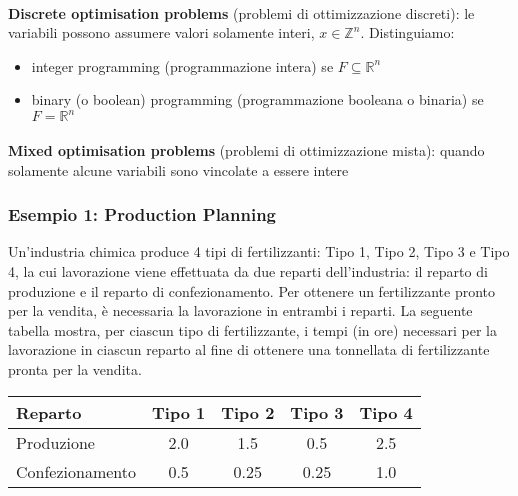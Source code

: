 \documentclass[a4paper, 11pt]{article}
\begin{document}
            \paragraph{}
            \textbf{Discrete optimisation problems} (problemi di ottimizzazione discreti): le variabili possono assumere valori solamente interi, $x \in \mathbb{Z}^n$. Distinguiamo:
            \begin{itemize}
                \item integer programming (programmazione intera) se $F \subseteq \mathbb{R}^n$
                \item binary (o boolean) programming (programmazione booleana o binaria) se $F = \mathbb{R}^n$ 
            \end{itemize} 

            \paragraph{}
            \textbf{Mixed optimisation problems} (problemi di ottimizzazione mista): quando solamente alcune variabili sono vincolate a essere intere
            
        \subsubsection{Esempio 1: Production Planning}
        Un'industria chimica produce 4 tipi di fertilizzanti: Tipo 1, Tipo 2, Tipo 3 e Tipo 4, la cui lavorazione viene effettuata da due reparti dell'industria: il reparto di produzione e il reparto di confezionamento. Per ottenere un fertilizzante pronto per la vendita, è necessaria la lavorazione in entrambi i reparti. La seguente tabella mostra, per ciascun tipo di fertilizzante, i tempi (in ore) necessari per la lavorazione in ciascun reparto al fine di ottenere una tonnellata di fertilizzante pronta per la vendita.

        \begin{table}[ht]
            \centering
            \begin{tabular}{|l|c|c|c|c|}
            \hline
            \textbf{Reparto}            & \textbf{Tipo 1} & \textbf{Tipo 2} & \textbf{Tipo 3} & \textbf{Tipo 4} \\ \hline
            Produzione                  & 2.0             & 1.5             & 0.5             & 2.5             \\ 
            Confezionamento             & 0.5             & 0.25            & 0.25            & 1.0             \\ \hline
            \end{tabular}
        \end{table}
\end{document}
